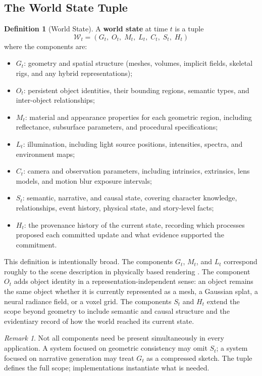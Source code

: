 \documentclass[12pt,a4paper]{article}
\theoremstyle{plain}
\theoremstyle{definition}
\newtheorem{definition}[theorem]{Definition}
\theoremstyle{remark}
\newtheorem{remark}[theorem]{Remark}
\begin{document}
\subsection{The World State Tuple}

\begin{definition}[World State]
A \textbf{world state} at time $t$ is a tuple
\[
\mathcal{W}_t = (G_t,\; O_t,\; M_t,\; L_t,\; C_t,\; S_t,\; H_t)
\]
where the components are:
\begin{itemize}[leftmargin=2em,itemsep=0pt]
\item $G_t$: geometry and spatial structure (meshes, volumes, implicit fields, skeletal rigs, and any hybrid representations);
\item $O_t$: persistent object identities, their bounding regions, semantic types, and inter-object relationships;
\item $M_t$: material and appearance properties for each geometric region, including reflectance, subsurface parameters, and procedural specifications;
\item $L_t$: illumination, including light source positions, intensities, spectra, and environment maps;
\item $C_t$: camera and observation parameters, including intrinsics, extrinsics, lens models, and motion blur exposure intervals;
\item $S_t$: semantic, narrative, and causal state, covering character knowledge, relationships, event history, physical state, and story-level facts;
\item $H_t$: the provenance history of the current state, recording which processes proposed each committed update and what evidence supported the commitment.
\end{itemize}
\end{definition}

This definition is intentionally broad. The components $G_t$, $M_t$, and $L_t$ correspond roughly to the scene description in physically based rendering \cite{pharr2023pbr}. The component $O_t$ adds object identity in a representation-independent sense: an object remains the same object whether it is currently represented as a mesh, a Gaussian splat, a neural radiance field, or a voxel grid. The components $S_t$ and $H_t$ extend the scope beyond geometry to include semantic and causal structure and the evidentiary record of how the world reached its current state.

\begin{remark}
Not all components need be present simultaneously in every application. A system focused on geometric consistency may omit $S_t$; a system focused on narrative generation may treat $G_t$ as a compressed sketch. The tuple defines the full scope; implementations instantiate what is needed.
\end{remark}
\end{document}
